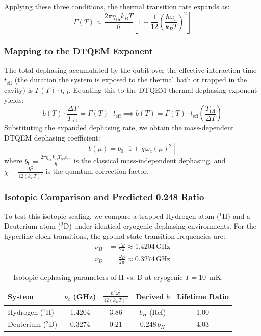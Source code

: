 \documentclass[reprint,amsmath,amssymb,aps,pra,superscriptaddress]{revtex4-2}
\begin{document}
Applying these three conditions, the thermal transition rate expands as:
\begin{equation}
    \Gamma(T) \approx \frac{2 \pi \eta_{\text{th}} k_B T}{\hbar} \left[ 1 + \frac{1}{12} \left( \frac{\hbar \omega_c}{k_B T} \right)^2 \right]
\end{equation}

\subsubsection{Mapping to the DTQEM Exponent}

The total dephasing accumulated by the qubit over the effective interaction time $t_{\text{eff}}$ (the duration the system is exposed to the thermal bath or trapped in the cavity) is $\Gamma(T) \cdot t_{\text{eff}}$. Equating this to the DTQEM thermal dephasing exponent yields:
\begin{equation}
    b(T) \cdot \frac{\Delta T}{T_{\text{ref}}} = \Gamma(T) \cdot t_{\text{eff}} \implies b(T) = \Gamma(T) \cdot t_{\text{eff}} \left( \frac{T_{\text{ref}}}{\Delta T} \right)
\end{equation}
Substituting the expanded dephasing rate, we obtain the mass-dependent DTQEM dephasing coefficient:
\begin{equation}
    b(\mu) = b_0 \left[ 1 + \chi \omega_c(\mu)^2 \right]
    \label{eq:b_quantum_scaling}
\end{equation}
where $b_0 = \frac{2 \pi \eta_{\text{th}} k_B T_{\text{ref}} t_{\text{eff}}}{\hbar}$ is the classical mass-independent dephasing, and $\chi = \frac{\hbar^2}{12 (k_B T)^2}$ is the quantum correction factor.

\subsubsection{Isotopic Comparison and Predicted 0.248 Ratio}

To test this isotopic scaling, we compare a trapped Hydrogen atom ($^1$H) and a Deuterium atom ($^2$D) under identical cryogenic dephasing environments. For the hyperfine clock transitions, the ground-state transition frequencies are:
\begin{align}
    \nu_H &= \frac{\omega_H}{2\pi} \approx 1.4204\,\text{GHz} \\
    \nu_D &= \frac{\omega_D}{2\pi} \approx 0.3274\,\text{GHz}
\end{align}

\begin{table}[h]
\caption{Isotopic dephasing parameters of H vs. D at cryogenic $T = 10$~mK.}
\label{tab:isotopic}
\begin{ruledtabular}
\begin{tabular}{lcccc}
System & $\nu_c$ (GHz) & $\frac{\hbar^2 \omega_c^2}{12 (k_B T)^2}$ & Derived $b$ & Lifetime Ratio \\ \hline
Hydrogen ($^1$H) & 1.4204 & 3.86 & $b_H$ (Ref) & 1.00 \\
Deuterium ($^2$D) & 0.3274 & 0.21 & $0.248\,b_H$ & 4.03 \\
\end{tabular}
\end{ruledtabular}
\end{table}
\end{document}
